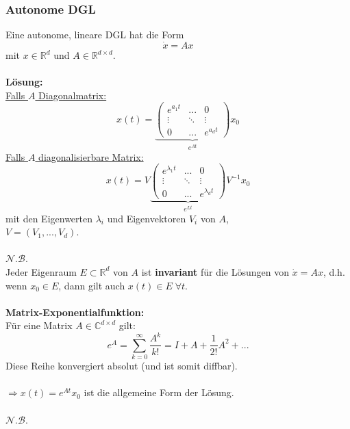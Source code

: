 \documentclass[a4paper,twocolumn,10pt]{article}
\begin{document}
\subsubsection{Autonome DGL}
Eine autonome, lineare DGL hat die Form
\begin{equation*}
\dot{x}=Ax
\end{equation*}
mit $x\in\mathbb{R}^d$ und $A\in\mathbb{R}^{d\times d}$.\\\\
\textbf{Lösung:}\\
\underline{Falls $A$ Diagonalmatrix:}
\begin{equation*}
x(t)=\underbrace{\begin{pmatrix}e^{a_1t} & ... & 0 \\ \vdots & \ddots & \vdots \\ 0 & ... & e^{a_dt}\end{pmatrix}}_{e^{At}}x_0
\end{equation*}
\underline{Falls $A$ diagonalisierbare Matrix:}
\begin{equation*}
x(t)=V\underbrace{\begin{pmatrix}e^{\lambda_1t} & ... & 0 \\ \vdots & \ddots & \vdots \\ 0 & ... & e^{\lambda_dt}\end{pmatrix}}_{e^{Lt}}V^{-1}x_0
\end{equation*}
mit den Eigenwerten $\lambda_i$ und Eigenvektoren $V_i$ von $A$,\\
$V=(V_1,...,V_d)$.\\\\
\underline{$\mathcal{N.B.}$}\\
Jeder Eigenraum $E\subset\mathbb{R}^d$ von $A$ ist \textbf{invariant} für die Lösungen von $\dot{x}=Ax$, d.h. wenn $x_0\in E$, dann gilt auch $x(t)\in E\;\forall t$.\\\\
\textbf{Matrix-Exponentialfunktion:}\\
Für eine Matrix $A\in\mathbb{C}^{d\times d}$ gilt:
\begin{equation*}
e^A=\sum\limits_{k=0}^{\infty}\frac{A^k}{k!}=I+A+\frac{1}{2!}A^2+...
\end{equation*}
Diese Reihe konvergiert absolut (und ist somit diffbar).\\\\
$\Rightarrow x(t)=e^{At}x_0$ ist die allgemeine Form der Lösung.\\\\
\underline{$\mathcal{N.B.}$}
\end{document}
